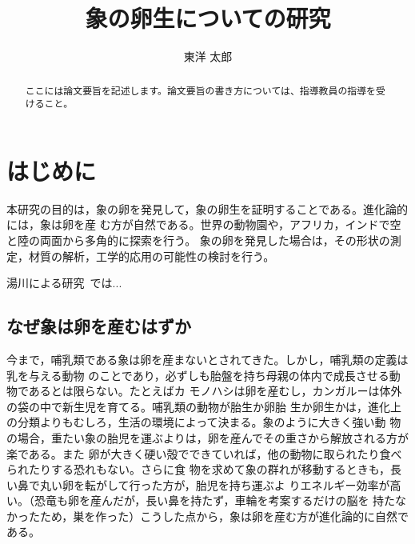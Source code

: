 \documentclass[bachelor]{INIAD}%
\title{象の卵生についての研究}
\author{東洋 太郎}
\begin{document}
\maketitle%

\frontmatter%



\begin{abstract}%
 ここには論文要旨を記述します。論文要旨の書き方については、指導教員の指導を受けること。
\end{abstract}

{\makeatletter
\let\ps@jpl@in\ps@empty
\makeatother
\pagestyle{empty}
\tableofcontents
\clearpage}

\mainmatter%
\chapter{はじめに}
本研究の目的は，象の卵を発見して，象の卵生を証明することである。進化論的には，象は卵を産
む方が自然である。世界の動物園や，アフリカ，インドで空と陸の両面から多角的に探索を行う。
象の卵を発見した場合は，その形状の測定，材質の解析，工学的応用の可能性の検討を行う。

湯川による研究~\cite{yukawa1950quantum}では...

\section{なぜ象は卵を産むはずか}
今まで，哺乳類である象は卵を産まないとされてきた。しかし，哺乳類の定義は乳を与える動物
のことであり，必ずしも胎盤を持ち母親の体内で成長させる動物であるとは限らない。たとえばカ
モノハシは卵を産むし，カンガルーは体外の袋の中で新生児を育てる。哺乳類の動物が胎生か卵胎
生か卵生かは，進化上の分類よりもむしろ，生活の環境によって決まる。象のように大きく強い動
物の場合，重たい象の胎児を運ぶよりは，卵を産んでその重さから解放される方が楽である。また
卵が大きく硬い殻でできていれば，他の動物に取られたり食べられたりする恐れもない。さらに食
物を求めて象の群れが移動するときも，長い鼻で丸い卵を転がして行った方が，胎児を持ち運ぶよ
りエネルギー効率が高い。（恐竜も卵を産んだが，長い鼻を持たず，車輪を考案するだけの脳を
持たなかったため，巣を作った）こうした点から，象は卵を産む方が進化論的に自然である。
\end{document}
